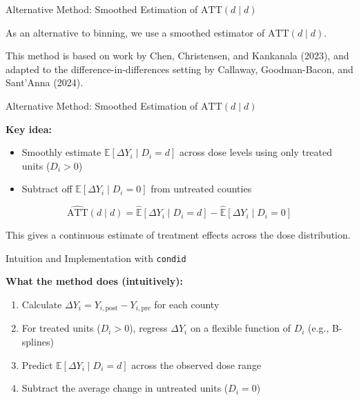 \documentclass{beamer}
\begin{document}
\begin{frame}{Alternative Method: Smoothed Estimation of $\text{ATT}(d \mid d)$}

As an alternative to binning, we use a smoothed estimator of $\text{ATT}(d \mid d)$.

\bigskip

This method is based on work by Chen, Christensen, and Kankanala (2023), and adapted to the difference-in-differences setting by Callaway, Goodman-Bacon, and Sant’Anna (2024).


\end{frame}


\begin{frame}{Alternative Method: Smoothed Estimation of $\text{ATT}(d \mid d)$}

\textbf{Key idea:}
\begin{itemize}
  \item Smoothly estimate $\mathbb{E}[\Delta Y_i \mid D_i = d]$ across dose levels using only treated units ($D_i > 0$)
  \item Subtract off $\mathbb{E}[\Delta Y_i \mid D_i = 0]$ from untreated counties
\end{itemize}

\[
\widehat{\text{ATT}}(d \mid d) = \widehat{\mathbb{E}}[\Delta Y_i \mid D_i = d] - \widehat{\mathbb{E}}[\Delta Y_i \mid D_i = 0]
\]

This gives a continuous estimate of treatment effects across the dose distribution.

\end{frame}




\begin{frame}{Intuition and Implementation with \texttt{condid}}

\textbf{What the method does (intuitively):}
\begin{enumerate}
  \item Calculate $\Delta Y_i = Y_{i,\text{post}} - Y_{i,\text{pre}}$ for each county
  \item For treated units ($D_i > 0$), regress $\Delta Y_i$ on a flexible function of $D_i$ (e.g., B-splines)
  \item Predict $\mathbb{E}[\Delta Y_i \mid D_i = d]$ across the observed dose range
  \item Subtract the average change in untreated units ($D_i = 0$)
\end{enumerate}


\end{frame}
\end{document}

